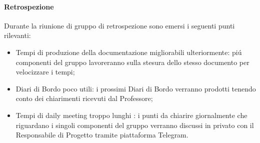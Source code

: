 \paragraph{Retrospezione}
Durante la riunione di gruppo di retrospezione sono emersi i seguenti punti rilevanti:

\begin{itemize}
	\item Tempi di produzione della documentazione migliorabili ulteriormente: 
	piú componenti del gruppo lavoreranno sulla stesura dello stesso documento per velocizzare i tempi; 
	\item Diari di Bordo poco utili: i prossimi Diari di Bordo verranno prodotti tenendo conto dei chiarimenti ricevuti dal Professore;
	\item Tempi di daily meeting troppo lunghi : i punti da chiarire giornalmente che riguardano i singoli componenti del gruppo 
	verranno discussi in privato con il Responsabile di Progetto tramite piattaforma Telegram. 
\end{itemize}